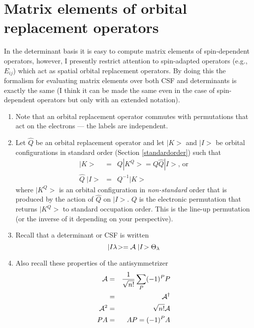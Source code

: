 \documentclass[fullpage,12pt,fleqn]{article}
\begin{document}
\section{Matrix elements of orbital replacement operators}

In the determinant basis it is easy to compute matrix elements of
spin-dependent operators, however, I presently restrict attention to
spin-adapted operators (e.g., $E_{ij}$) which act as spatial orbital
replacement operators.  By doing this the formalism for evaluating
matrix elements over both CSF and determinants is exactly the same (I
think it can be made the same even in the case of spin-dependent
operators but only with an extended notation).

\begin{enumerate}
\item Note that an orbital replacement operator commutes with
permutations that act on the electrons --- the labels are independent.

\item Let $\hat{Q}$ be an orbital replacement operator and let $|K\! >$
and $|I\! >$ be orbital configurations in standard order (Section
\ref{standardorder}) such that
\begin{eqnarray}
  |K\! > & = & Q |K^Q\! > =  Q \hat{Q} |I\! > \mbox{, or}
\label{qik1} \\
  \hat{Q} \; |I \! > & = & Q^{-1} |K \! > \label{qik}
\end{eqnarray}
where $|K^Q\! >$ is an orbital configuration in {\em non-standard}
order that is produced by the action of $\hat{Q}$ on $|I\! >$.  $Q$ is
the electronic permutation that returns $|K^Q\! >$ to standard
occupation order.  This is the line-up permutation (or the inverse of
it depending on your perspective).

\item Recall that a determinant or CSF is written 
\begin{equation}
|I \lambda\! > = {\cal A} \; |I\! > \Theta_{\lambda} \label{csfdefn}
\end{equation}

\item Also recall these properties of the antisymmetrizer
\begin{eqnarray}
 {\cal A} & = & \frac{1}{\sqrt{n!}} \sum_P (-1)^P P \\
          & = & {\cal A}^{\dagger} \\
 {\cal A}^2 & = & \sqrt{n!} {\cal A} \\
     PA & = & AP = (-1)^P A \label{paap}
\end{eqnarray}


\end{enumerate}
\end{document}
